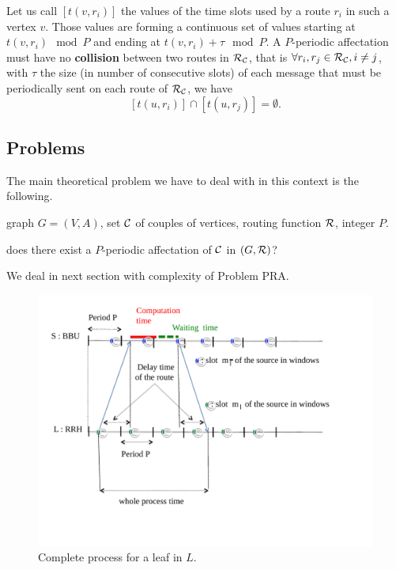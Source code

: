 \documentclass[a4paper,10pt]{article}
\begin{document}
      Let us call $[t(v,r_i)]$ the values of the time slots used by a route $r_i$ in such a vertex $v$. 
      Those values are forming a continuous set of values starting at $t(v,r_i) \mod P$ and ending at $t(v,r_i) + \tau \mod P$. A $P$-periodic affectation must have no {\bf collision} between two routes in ${\cal R}_{\cal C}$, that is $\forall r_i, r_j \in {\cal R}_{\cal C}, i \ne j$, with $\tau$ the size (in number of consecutive slots) of each message that must be periodically sent on each route of ${\cal R}_{\cal C}$,
      we have $$[t(u,r_i)] \cap [t(u,r_j)] = \emptyset .$$
      
   \subsection{Problems}

      The main theoretical problem we have to deal with in this context is the following.\\


       graph $G=(V,A)$, set $\cal C$ of couples of vertices, routing function $\cal R$, integer $P$.

       does there exist a $P$-periodic affectation of $\cal C$ in $(G,{\cal R})$?

      We deal in next section with complexity of Problem PRA.\\

      \begin{figure}[H]
      \label{could-ran}
      \begin{center}
      \includegraphics[scale=0.5]{Total-latence.pdf}
      \caption{Complete process for a leaf in $L$.}
      \end{center}
      \end{figure}
\end{document}
